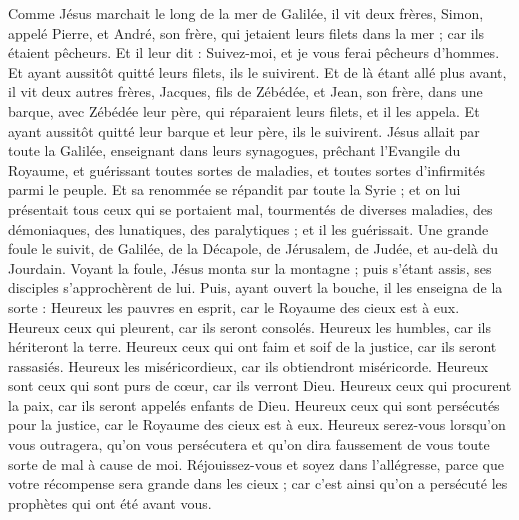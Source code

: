 \begin{multicols}{2}
Comme Jésus marchait le long de la mer de Galilée, il vit deux frères, Simon, appelé Pierre, et André, son frère, qui jetaient leurs filets dans la mer ; car ils étaient pêcheurs.
Et il leur dit : Suivez-moi, et je vous ferai pêcheurs d'hommes.
Et ayant aussitôt quitté leurs filets, ils le suivirent.
Et de là étant allé plus avant, il vit deux autres frères, Jacques, fils de Zébédée, et Jean, son frère, dans une barque, avec Zébédée leur père, qui réparaient leurs filets, et il les appela.
Et ayant aussitôt quitté leur barque et leur père, ils le suivirent.
Jésus allait par toute la Galilée, enseignant dans leurs synagogues, prêchant l'Evangile du Royaume, et guérissant toutes sortes de maladies, et toutes sortes d’infirmités parmi le peuple.
Et sa renommée se répandit par toute la Syrie ; et on lui présentait tous ceux qui se portaient mal, tourmentés de diverses maladies, des démoniaques, des lunatiques, des paralytiques ; et il les guérissait.
Une grande foule le suivit, de Galilée, de la Décapole, de Jérusalem, de Judée, et au-delà du Jourdain.
\VerseOne{}Voyant la foule, Jésus monta sur la montagne ; puis s'étant assis, ses disciples s'approchèrent de lui.
Puis, ayant ouvert la bouche, il les enseigna de la sorte :
Heureux les pauvres en esprit, car le Royaume des cieux est à eux.
Heureux ceux qui pleurent, car ils seront consolés.
Heureux les humbles, car ils hériteront la terre.
Heureux ceux qui ont faim et soif de la justice, car ils seront rassasiés.
Heureux les miséricordieux, car ils obtiendront miséricorde.
Heureux sont ceux qui sont purs de cœur, car ils verront Dieu.
Heureux ceux qui procurent la paix, car ils seront appelés enfants de Dieu.
Heureux ceux qui sont persécutés pour la justice, car le Royaume des cieux est à eux.
Heureux serez-vous lorsqu’on vous outragera, qu’on vous persécutera et qu’on dira faussement de vous toute sorte de mal à cause de moi.
Réjouissez-vous et soyez dans l’allégresse, parce que votre récompense sera grande dans les cieux ; car c’est ainsi qu’on a persécuté les prophètes qui ont été avant vous.

\end{multicols}
